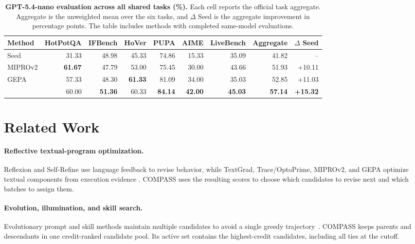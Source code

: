 \begin{table}[H]
\caption{\textbf{GPT-5.4-nano evaluation across all shared tasks (\%).}
Each cell reports the official task aggregate.  Aggregate is the unweighted
mean over the six tasks, and $\Delta$ Seed is the aggregate improvement in
percentage points.  The table includes methods with completed same-model
evaluations.}
\label{tab:nano_results}
\begin{center}
\setlength{\tabcolsep}{3.3pt}
\begin{tabular*}{\linewidth}{@{\extracolsep{\fill}}lrrrrrrrr@{}}
\toprule
Method & HotPotQA & IFBench & HoVer & PUPA & AIME & LiveBench & Aggregate & $\Delta$ Seed \\
\midrule
Seed & 31.33 & 48.98 & 45.33 & 74.86 & 15.33 & 35.09 & 41.82 & -- \\
MIPROv2 & \textbf{61.67} & 47.79 & 53.00 & 75.45 & 30.00 & 43.66 & 51.93 & +10.11 \\
GEPA & 57.33 & 48.30 & \textbf{61.33} & 81.09 & 34.00 & 35.03 & 52.85 & +11.03 \\
\method{} & 60.00 & \textbf{51.36} & 60.33 & \textbf{84.14} & \textbf{42.00} & \textbf{45.03} & \textbf{57.14} & \textbf{+15.32} \\
\bottomrule
\end{tabular*}
\end{center}
\end{table}

\section{Related Work}
\label{sec:related}

\paragraph{Reflective textual-program optimization.}
Reflexion and Self-Refine use language feedback to revise behavior, while
TextGrad, Trace/OptoPrime, MIPROv2, and GEPA optimize textual components from
execution evidence
\citep{reflexion,self_refine,textgrad,
cheng2024traceautodiffgenerativeoptimization,miprov2,gepa}.  COMPASS uses the
resulting scores to choose which candidates to revise next and which batches
to assign them.

\paragraph{Evolution, illumination, and skill search.}
Evolutionary prompt and skill methods maintain multiple candidates to avoid a
single greedy trajectory~\citep{gepa,skillpro,grasp,evoskills,metaskillevolve}.
COMPASS keeps parents and descendants in one credit-ranked candidate pool.
Its active set contains the highest-credit candidates, including all ties at
the cutoff.


